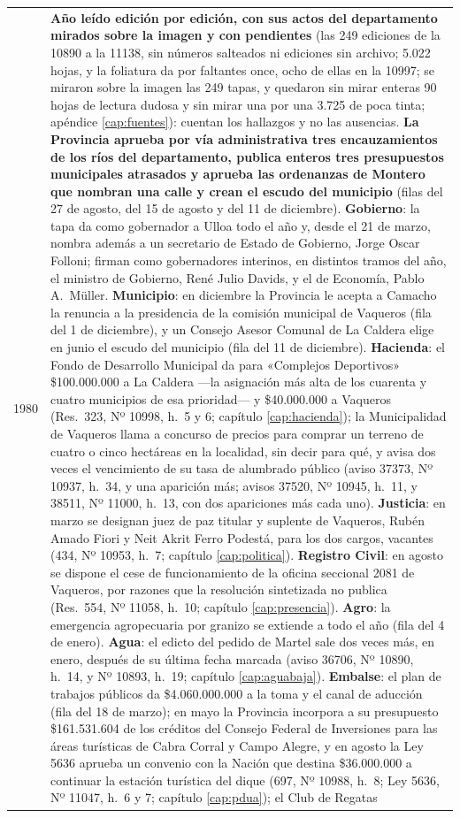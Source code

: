 \begin{longtable}{@{}p{2.7cm}p{10.3cm}@{}}
1980 & \textbf{Año leído edición por edición, con sus actos del departamento mirados sobre la imagen y con pendientes} (las 249 ediciones de la 10890 a la 11138, sin números salteados ni ediciones sin archivo; 5.022 hojas, y la foliatura da por faltantes once, ocho de ellas en la 10997; se miraron sobre la imagen las 249 tapas, y quedaron sin mirar enteras 90 hojas de lectura dudosa y sin mirar una por una 3.725 de poca tinta; apéndice \ref{cap:fuentes}): cuentan los hallazgos y no las ausencias. \textbf{La Provincia aprueba por vía administrativa tres encauzamientos de los ríos del departamento, publica enteros tres presupuestos municipales atrasados y aprueba las ordenanzas de Montero que nombran una calle y crean el escudo del municipio} (filas del 27 de agosto, del 15 de agosto y del 11 de diciembre). \textbf{Gobierno}: la tapa da como gobernador a Ulloa todo el año y, desde el 21 de marzo, nombra además a un secretario de Estado de Gobierno, Jorge Oscar Folloni; firman como gobernadores interinos, en distintos tramos del año, el ministro de Gobierno, René Julio Davids, y el de Economía, Pablo A.\ Müller. \textbf{Municipio}: en diciembre la Provincia le acepta a Camacho la renuncia a la presidencia de la comisión municipal de Vaqueros (fila del 1 de diciembre), y un Consejo Asesor Comunal de La Caldera elige en junio el escudo del municipio (fila del 11 de diciembre). \textbf{Hacienda}: el Fondo de Desarrollo Municipal da para «Complejos Deportivos» \$100.000.000 a La Caldera ---la asignación más alta de los cuarenta y cuatro municipios de esa prioridad--- y \$40.000.000 a Vaqueros (Res.\ 323, Nº 10998, h.\ 5 y 6; capítulo \ref{cap:hacienda}); la Municipalidad de Vaqueros llama a concurso de precios para comprar un terreno de cuatro o cinco hectáreas en la localidad, sin decir para qué, y avisa dos veces el vencimiento de su tasa de alumbrado público (aviso 37373, Nº 10937, h.\ 34, y una aparición más; avisos 37520, Nº 10945, h.\ 11, y 38511, Nº 11000, h.\ 13, con dos apariciones más cada uno). \textbf{Justicia}: en marzo se designan juez de paz titular y suplente de Vaqueros, Rubén Amado Fiori y Neit Akrit Ferro Podestá, para los dos cargos, vacantes (434, Nº 10953, h.\ 7; capítulo \ref{cap:politica}). \textbf{Registro Civil}: en agosto se dispone el cese de funcionamiento de la oficina seccional 2081 de Vaqueros, por razones que la resolución sintetizada no publica (Res.\ 554, Nº 11058, h.\ 10; capítulo \ref{cap:presencia}). \textbf{Agro}: la emergencia agropecuaria por granizo se extiende a todo el año (fila del 4 de enero). \textbf{Agua}: el edicto del pedido de Martel sale dos veces más, en enero, después de su última fecha marcada (aviso 36706, Nº 10890, h.\ 14, y Nº 10893, h.\ 19; capítulo \ref{cap:aguabaja}). \textbf{Embalse}: el plan de trabajos públicos da \$4.060.000.000 a la toma y el canal de aducción (fila del 18 de marzo); en mayo la Provincia incorpora a su presupuesto \$161.531.604 de los créditos del Consejo Federal de Inversiones para las áreas turísticas de Cabra Corral y Campo Alegre, y en agosto la Ley 5636 aprueba un convenio con la Nación que destina \$36.000.000 a continuar la estación turística del dique (697, Nº 10988, h.\ 8; Ley 5636, Nº 11047, h.\ 6 y 7; capítulo \ref{cap:pdua}); el Club de Regatas 
\end{longtable}

